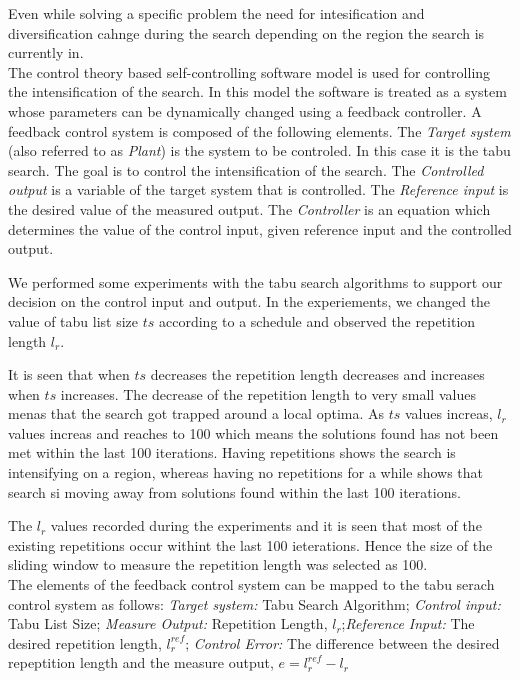 \documentclass[pdftex,11pt]{article}
\begin{document}
Even while solving a specific problem the need for intesification and diversification cahnge during the search depending on the region the search is currently in.\\

The control theory based self-controlling software model is used for controlling the intensification of the search. In this model the software is treated as a system whose parameters can be dynamically changed using a feedback controller. A feedback control system is composed of the following elements. The \emph{Target system} (also referred to as \emph{Plant}) is the system to be controled. In this case it is the tabu search. The goal is to control the intensification of the search. The \emph{Controlled output} is a variable of the target system that is controlled. The \emph{Reference input} is the desired value of the measured output. The \emph{Controller} is an equation which determines the value of the control input, given reference input and the controlled output.

We performed some experiments with the tabu search algorithms to support our decision on the control input and output. In the experiements, we changed the value of tabu list size $ts$ according to a schedule and observed the repetition length $l_r$.

It is seen that when $ts$ decreases the repetition length decreases and increases when $ts$ increases. The decrease of the repetition length to very small values menas that the search got trapped around a local optima. As $ts$ values increas, $l_r$ values increas and reaches to 100 which means the solutions found has not been met within the last 100 iterations. Having repetitions shows the search is intensifying on a region, whereas having no repetitions for a while shows that search si moving away from solutions found within the last 100 iterations.

The $l_r$ values recorded during the experiments and it is seen that most of the existing repetitions occur withint the last 100 ieterations. Hence the size of the sliding window to measure the repetition length was selected as 100.\\

The elements of the feedback control system can be mapped to the tabu serach control system as follows: \emph{Target system:} Tabu Search Algorithm; \emph{Control input:} Tabu List Size; \emph{Measure Output:} Repetition Length, $l_r$;\emph{Reference Input:} The desired repetition length, $l^{ref}_r$; \emph{Control Error:} The difference between the desired repeptition length and the measure output, $e = l^{ref}_r - l_r$\\
\end{document}
